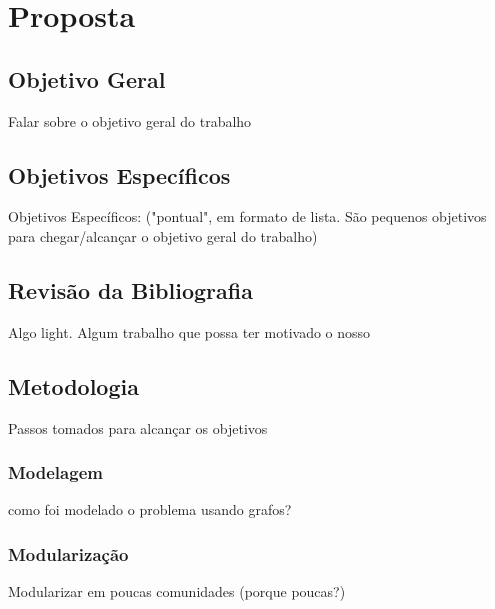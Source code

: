 \chapter{Proposta}
\label{cap3_proposta}

\section{Objetivo Geral}
\label{secao_objetivo_geral}

Falar sobre o objetivo geral do trabalho

\section{Objetivos Específicos}
\label{secao_objetivos_especificos}

Objetivos Específicos: ("pontual", em formato de lista. São pequenos objetivos para chegar/alcançar o objetivo geral do trabalho)

\section{Revisão da Bibliografia}
\label{secao_revisao_bibliografia}

Algo light. Algum trabalho que possa ter motivado o nosso

\section{Metodologia}
\label{secao_metodologia}

Passos tomados para alcançar os objetivos

\subsection{Modelagem}
\label{subsecao_modelagem}
como foi modelado o problema usando grafos?

\subsection{Modularização}
\label{subsecao_modularizacao}

Modularizar em poucas comunidades (porque poucas?) 

